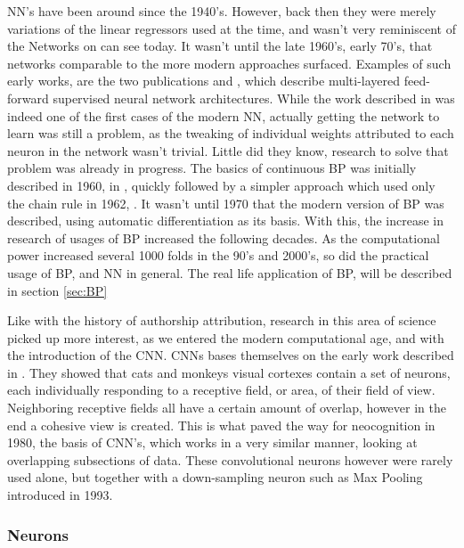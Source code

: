 \gls{NN}'s have been around since the 1940's. However, back then they were
merely variations of the linear regressors used at the time, and wasn't
very reminiscent of the Networks on can see today. It wasn't until the
late 1960's, early 70's, that networks comparable to the more modern
approaches surfaced. Examples of such early works, are the two publications
\cite{ivakhnenko1973cybernetic} and \cite{4308320}, which describe multi-layered
feed-forward supervised neural network architectures. While the work described
in \cite{4308320} was indeed one of the first cases of the modern \gls{NN},
actually getting the network to learn was still a problem, as the tweaking of
individual weights attributed to each neuron in the network wasn't trivial.
Little did they know, research to solve that problem was already in progress.
The basics of continuous \gls{BP} was initially described in 1960, in
\cite{Kelley1960}, quickly followed by a simpler approach which used only the
chain rule in 1962, \cite{DREYFUS196230}. It wasn't until 1970 that the modern
version of \gls{BP} was described, using automatic differentiation as its
basis. With this, the increase in research of usages of \gls{BP} increased the
following decades. As the computational power increased several 1000 folds in
the 90's and 2000's, so did the practical usage of \gls{BP}, and \gls{NN} in
general\cite{Schmidhuber:2015}. The real life application of \gls{BP}, will be described
in section \ref{sec:BP}

Like with the history of authorship attribution, research in this area of
science picked up more interest, as we entered the modern computational age,
and with the introduction of the \gls{CNN}. \gls{CNN}s bases themselves on
the early work described in \cite{TJP:TJP19681951215}. They showed that cats
and monkeys visual cortexes contain a set of neurons, each individually
responding to a receptive field, or area, of their field of view. Neighboring
receptive fields all have a certain amount of overlap, however in the end
a cohesive view is created. This is what paved the way for neocognition in
1980\cite{Fukushima1980}, the basis of \gls{CNN}'s, which works in a very
similar manner, looking at overlapping subsections of data. These convolutional
neurons however were rarely used alone, but together with a down-sampling neuron
such as Max Pooling introduced in 1993.\cite{Schmidhuber:2015}

\subsubsection{Neurons}

